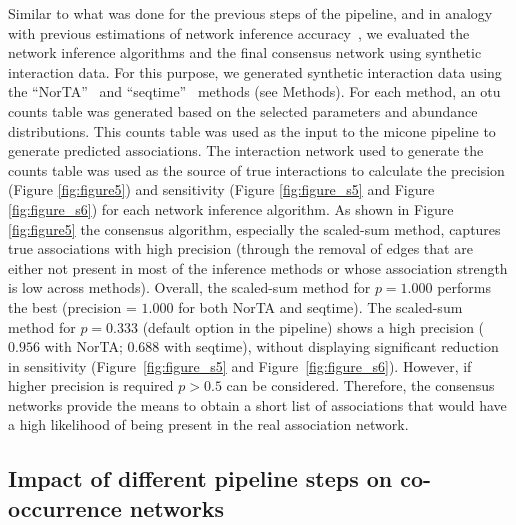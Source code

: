 \documentclass[letterpaper,12pt]{article}
\begin{document}
  Similar to what was done for the previous steps of the pipeline, and in analogy with previous estimations of network inference accuracy~\cite{Kurtz2015,Weiss2016}, we evaluated the network inference algorithms and the final consensus network using synthetic interaction data.
  For this purpose, we generated synthetic interaction data using the ``NorTA''~\cite{Kurtz2015} and ``seqtime''~\cite{faustSignaturesEcologicalProcesses2018} methods (see Methods).
  For each method, an \ac{otu} counts table was generated based on the selected parameters and abundance distributions.
  This counts table was used as the input to the \ac{micone} pipeline to generate predicted associations.
  The interaction network used to generate the counts table was used as the source of true interactions to calculate the precision (Figure \ref{fig:figure5}) and sensitivity (Figure \ref{fig:figure_s5} and Figure \ref{fig:figure_s6}) for each network inference algorithm.
  As shown in Figure \ref{fig:figure5} the consensus algorithm, especially the scaled-sum method, captures true associations with high precision (through the removal of edges that are either not present in most of the inference methods or whose association strength is low across methods).
  Overall, the scaled-sum method for $p=1.000$ performs the best (precision = $1.000$ for both NorTA and seqtime).
  The scaled-sum method for $p=0.333$ (default option in the pipeline) shows a high precision ($0.956$ with NorTA; $0.688$ with seqtime), without displaying significant reduction in sensitivity (Figure~\ref{fig:figure_s5} and Figure~\ref{fig:figure_s6}).
  However, if higher precision is required $p>0.5$ can be considered.
  Therefore, the consensus networks provide the means to obtain a short list of associations that would have a high likelihood of being present in the real association network.

  \FloatBarrier

  \subsection*{Impact of different pipeline steps on co-occurrence networks}
\end{document}
